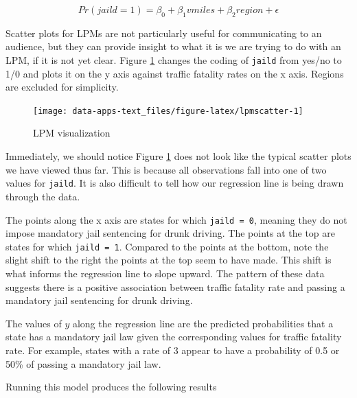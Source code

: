 \documentclass[
]{book}
\begin{document}
\begin{equation}
Pr(jaild=1)=\beta_0+\beta_1vmiles+\beta_2region+\epsilon
\label{eq:lpmex}
\end{equation}

Scatter plots for LPMs are not particularly useful for communicating to an audience, but they can provide insight to what it is we are trying to do with an LPM, if it is not yet clear. Figure \ref{fig:lpmscatter} changes the coding of \texttt{jaild} from yes/no to 1/0 and plots it on the y axis against traffic fatality rates on the x axis. Regions are excluded for simplicity.

\begin{figure}

{\centering \texttt{[image: data-apps-text\_files/figure-latex/lpmscatter-1]} 

}

\caption{LPM visualization}\label{fig:lpmscatter}
\end{figure}

Immediately, we should notice Figure \ref{fig:lpmscatter} does not look like the typical scatter plots we have viewed thus far. This is because all observations fall into one of two values for \texttt{jaild}. It is also difficult to tell how our regression line is being drawn through the data.

The points along the x axis are states for which \texttt{jaild\ =\ 0}, meaning they do not impose mandatory jail sentencing for drunk driving. The points at the top are states for which \texttt{jaild\ =\ 1}. Compared to the points at the bottom, note the slight shift to the right the points at the top seem to have made. This shift is what informs the regression line to slope upward. The pattern of these data suggests there is a positive association between traffic fatality rate and passing a mandatory jail sentencing for drunk driving.

The values of \(y\) along the regression line are the predicted probabilities that a state has a mandatory jail law given the corresponding values for traffic fatality rate. For example, states with a rate of 3 appear to have a probability of 0.5 or 50\% of passing a mandatory jail law.

Running this model produces the following results
\end{document}
